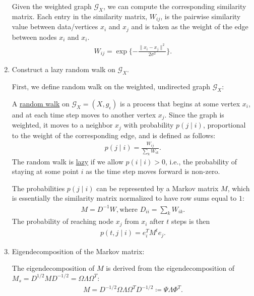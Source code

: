 \begin{enumerate}
Given the weighted graph $\mathcal{G}_X$, we can compute the corresponding similarity matrix. Each entry in the similarity matrix, $W_{i j}$, is the pairwise similarity value between data/vertices $x_i$ and $x_j$ and is taken as the weight of the edge between nodes $x_i$ and $x_i$. 
    \begin{align}
        W_{i j } = \exp\{-\frac{\|x_i - x_j\|^2}{2\sigma^2}\}.
    \end{align}
    
\item Construct a lazy random walk on $\mathcal{G}_X$. 

First, we define random walk on the weighted, undirected graph $\mathcal{G}_X$: 

\begin{defn}
A \underline{random walk} on $\mathcal{G}_X = (X,g_\epsilon)$ is a process that begins at some vertex $x_i$, and at each time step moves to another vertex $x_j$. Since the graph is weighted, it moves to a neighbor $x_j$ with probability $p(j \mid i)$, proportional to the weight of the corresponding edge, and is defined as follows:
\begin{align}
        p(j\mid i) = \frac{W_{i j}}{\sum_{k} W_{i k}}.
\end{align}
The random walk is \underline{lazy} if we allow $p(i\mid i) > 0$, i.e., the probability of staying at some point $i$ as the time step moves forward is non-zero.
\end{defn}
    
    The probabilities $p(j \mid i)$ can be represented by a Markov matrix $M$, which is essentially the similarity matrix normalized to have row sums equal to $1$:
     \begin{align}
        M = D^{-1} W, \text{where } D_{i i} =\sum_{k}W_{i k}.
    \end{align}
    The probability of reaching node $x_j$ from $x_i$ after $t$ steps is then
    \begin{align}
        p(t,j\mid i) = e_i^T M^t e_j.
    \end{align}

    \item Eigendecomposition of the Markov matrix:
    
    The eigendecomposition of $M$ is derived from the eigendecomposition of $M_s = D^{1/2} M D^{-1/2} = \Omega \Lambda \Omega^T$:
    \begin{align}
        M = D^{-1/2}  \Omega \Lambda \Omega^T D^{-1/2} \coloneqq \Psi \Lambda \Phi^T.
    \end{align}
    

\end{enumerate}
